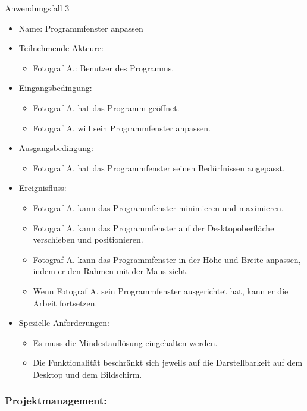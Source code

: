 \begin{description}
	\item[Anwendungsfall 3]
	\end{description}
	
	\begin{itemize}
		\item Name: Programmfenster anpassen
		\item Teilnehmende Akteure:
		\begin{itemize}
			\item	Fotograf A.: Benutzer des Programms.
		\end{itemize}
		\item Eingangsbedingung:
		\begin{itemize}
			\item Fotograf A. hat das Programm geöffnet.
			\item Fotograf A. will sein Programmfenster anpassen.						
		\end{itemize}
		\item Ausgangsbedingung:
		\begin{itemize}
			\item	Fotograf A. hat das Programmfenster seinen Bedürfnissen angepasst.		
		\end{itemize}
		\item Ereignisfluss:	
		\begin{itemize}
			\item Fotograf A. kann das Programmfenster minimieren und maximieren.
			\item Fotograf A. kann das Programmfenster auf der Desktopoberfläche verschieben und positionieren.
			\item Fotograf A. kann das Programmfenster in der Höhe und Breite anpassen, indem er den Rahmen mit der Maus zieht.
			\item Wenn Fotograf A. sein Programmfenster ausgerichtet hat, kann er die Arbeit fortsetzen.
		\end{itemize}
		\item Spezielle Anforderungen:
		\begin{itemize}
			\item	Es muss die Mindestauflösung eingehalten werden.
			\item Die Funktionalität beschränkt sich jeweils auf die Darstellbarkeit auf dem Desktop und dem Bildschirm.
		\end{itemize}
	\end{itemize}	
	
	\subsubsection{Projektmanagement:}
		

